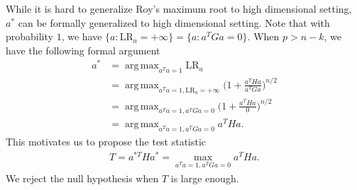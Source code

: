 \documentclass[12pt]{article} %
\DeclareMathOperator*{\argmax}{arg\,max}
\theoremstyle{definition}
\begin{document}
While it is hard to generalize Roy's maximum root to high dimensional setting, $a^*$ can be formally generalized to high dimensional setting.
Note that with probability $1$, we have $\{a:\text{LR}_a=+\infty\}=\{a:a^T G a=0\}$. When $p>n-k$, we have the following formal argument
$$
\begin{aligned}
    a^*&=\argmax_{a^T a=1} \text{LR}_{a}\\
    &=\argmax_{a^T a=1,\text{LR}_a=+\infty} \Big(1+\frac{a^T H a}{a^T G a}\Big)^{n/2}\\
    &=\argmax_{a^T a=1,a^T Ga=0} \Big(1+\frac{a^T H a}{0}\Big)^{n/2}\\
    &=\argmax_{a^T a=1,a^T Ga=0} {a^T H a}.
\end{aligned}
$$
This motivates us to propose the test statistic
\begin{equation*}
    \begin{aligned}
        T=a^{*T} H a^*
        =
        \max_{a^T a=1, a^T G a=0} 
        a^T H a.
    \end{aligned}
\end{equation*}
We reject the null hypothesis when $T$ is large enough.
\end{document}
